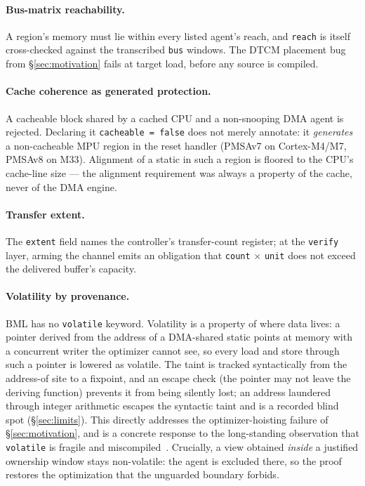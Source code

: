 \documentclass[10pt,twocolumn]{article}
\begin{document}
\paragraph{Bus-matrix reachability.} A region's memory must lie within every
listed agent's reach, and \texttt{reach} is itself cross-checked against the
transcribed \texttt{bus} windows. The DTCM placement bug from
\S\ref{sec:motivation} fails at target load, before any source is compiled.

\paragraph{Cache coherence as generated protection.} A cacheable block shared by
a cached CPU and a non-snooping DMA agent is rejected. Declaring it
\lstinline!cacheable = false! does not merely annotate: it \emph{generates} a
non-cacheable MPU region in the reset handler (PMSAv7 on Cortex-M4/M7, PMSAv8 on
M33). Alignment of a static in such a region is floored to the CPU's cache-line
size --- the alignment requirement was always a property of the cache, never of
the DMA engine.

\paragraph{Transfer extent.} The \texttt{extent} field names the controller's
transfer-count register; at the \texttt{verify} layer, arming the channel emits
an obligation that \texttt{count} $\times$ \texttt{unit} does not exceed the
delivered buffer's capacity.

\paragraph{Volatility by provenance.} BML has no \texttt{volatile} keyword.
Volatility is a property of where data lives: a pointer derived from the address
of a DMA-shared static points at memory with a concurrent writer the optimizer
cannot see, so every load and store through such a pointer is lowered as
volatile. The taint is tracked syntactically from the address-of site to a
fixpoint, and an escape check (the pointer may not leave the deriving function)
prevents it from being silently lost; an address laundered through integer
arithmetic escapes the syntactic taint and is a recorded blind spot
(\S\ref{sec:limits}). This directly addresses the optimizer-hoisting failure of
\S\ref{sec:motivation}, and is a concrete response to the long-standing
observation that \texttt{volatile} is fragile and miscompiled~\cite{eide2008}.
Crucially, a view obtained \emph{inside} a justified ownership window stays
non-volatile: the agent is excluded there, so the proof restores the
optimization that the unguarded boundary forbids.
\end{document}
